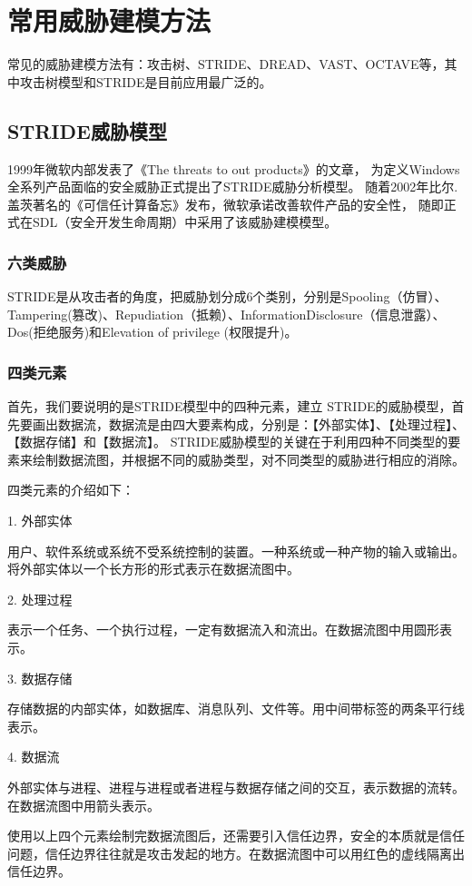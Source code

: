 \section{常用威胁建模方法}
常见的威胁建模方法有：攻击树、STRIDE、DREAD、VAST、OCTAVE等，其中攻击树模型和STRIDE是目前应用最广泛的。
\subsection{STRIDE威胁模型}
1999年微软内部发表了《The threats to out products》\cite{kohnfelder1999threats}的文章，
为定义Windows全系列产品面临的安全威胁正式提出了STRIDE威胁分析模型。
随着2002年比尔.盖茨著名的《可信任计算备忘》发布，微软承诺改善软件产品的安全性，
随即正式在SDL（安全开发生命周期）中采用了该威胁建模模型。
\subsubsection{六类威胁}

STRIDE是从攻击者的角度，把威胁划分成6个类别，分别是Spooling（仿冒）、Tampering(篡改)、Repudiation（抵赖）、InformationDisclosure（信息泄露）、Dos(拒绝服务)和Elevation of privilege (权限提升)。

\subsubsection{四类元素}

首先，我们要说明的是STRIDE模型中的四种元素，建立 STRIDE的威胁模型，首先要画出数据流，数据流是由四大要素构成，分别是：【外部实体】、【处理过程】、【数据存储】和【数据流】。
STRIDE威胁模型的关键在于利用四种不同类型的要素来绘制数据流图，并根据不同的威胁类型，对不同类型的威胁进行相应的消除。

四类元素的介绍如下：

1.  外部实体

用户、软件系统或系统不受系统控制的装置。一种系统或一种产物的输入或输出。将外部实体以一个长方形的形式表示在数据流图中。

2.  处理过程

表示一个任务、一个执行过程，一定有数据流入和流出。在数据流图中用圆形表示。

3.  数据存储

存储数据的内部实体，如数据库、消息队列、文件等。用中间带标签的两条平行线表示。

4.  数据流

外部实体与进程、进程与进程或者进程与数据存储之间的交互，表示数据的流转。在数据流图中用箭头表示。

使用以上四个元素绘制完数据流图后，还需要引入信任边界，安全的本质就是信任问题，信任边界往往就是攻击发起的地方。在数据流图中可以用红色的虚线隔离出信任边界。

